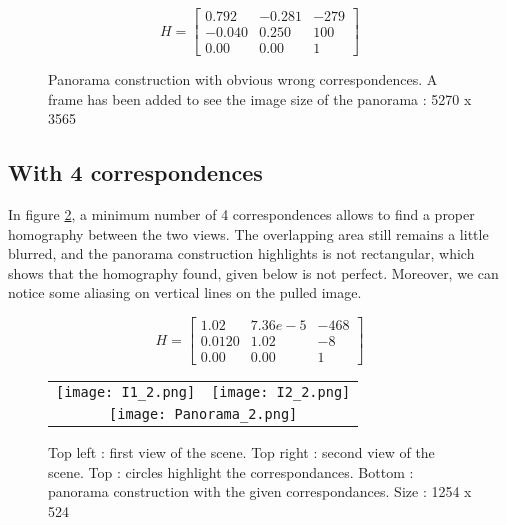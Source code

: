\documentclass[12pt,a4paper,onecolumn]{article}
\begin{document}
$$ H =
	\begin{bmatrix}
		0.792  & -0.281 & -279 \\
		-0.040 & 0.250  & 100  \\
		0.00   & 0.00   & 1
	\end{bmatrix}
$$

\begin{figure}[H]
	\begin{center}
	\end{center}
	\caption{Panorama construction with obvious wrong correspondences. A frame has been added to see the image size of the panorama : 5270 x 3565}
	\label{wrong_corr}
\end{figure}

\subsection{With 4 correspondences}

In figure \ref{mini_corr}, a minimum number of 4 correspondences allows to find a proper homography between the two views. The overlapping area still remains a little blurred, and the panorama construction highlights is not rectangular, which shows that the homography found, given below is not perfect. Moreover, we can notice some aliasing on vertical lines on the pulled image.

$$ H =
	\begin{bmatrix}
		1.02   & 7.36e-5 & -468 \\
		0.0120 & 1.02    & -8   \\
		0.00   & 0.00    & 1
	\end{bmatrix}
$$

\begin{figure}[H]
	\begin{center}
		\begin{tabular}{p{}  p{}}
			\texttt{[image: I1\_2.png]} &
			\texttt{[image: I2\_2.png]}   \\
			\multicolumn{2}{c}{\texttt{[image: Panorama\_2.png]}}
		\end{tabular}
	\end{center}
	\caption{Top left : first view of the scene. Top right : second view of the scene. Top : circles highlight the correspondances. Bottom : panorama construction with the given correspondances. Size : 1254 x 524}
	\label{mini_corr}
\end{figure}
\end{document}

